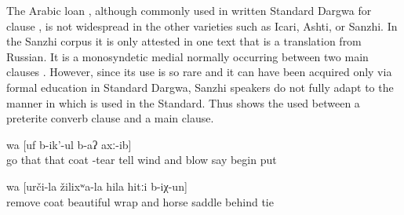 The Arabic loan , although commonly used in written Standard Dargwa for clause  \citep{vandenBerg2004}, is not widespread in the other varieties such as Icari, Ashti, or Sanzhi. In the Sanzhi corpus it is only attested in one text that is a translation from Russian. It is a monosyndetic medial  normally occurring between two main clauses . However, since its use is so rare and it can have been acquired only via formal education in Standard Dargwa, Sanzhi speakers do not fully adapt to the manner in which  is used in the Standard. Thus  shows the  used between a preterite converb clause and a main clause.
%
\begin{exe}
	\ex	\label{ex:‎I will blow at him, I will take his coat off, said the wind and began to blow}
	\gll	[``du	či-b-uq-un-ne	hel-i-j,	hel-i-la	walžaʁ	či-r-sa-jsː-an=da,''	b-urs-ib	č'an-ni]	wa	[uf	b-ik'-ul	b-aʔ	axː-ib]\\
			go	that	that	coat	-tear	tell	wind	and	blow	\tsc{n-}say	begin	put\\
	\glt	{}

	\ex	\label{ex:‎‎‎He took off his coat, put it together well, and tied it to his horse's saddle.}
		wa	[urči-la	žilixʷa-la	hila	hitːi	b-iχ-un]\\
		remove		coat	beautiful	wrap	and	horse\tsc{-gen}	saddle	behind		tie\\
	\glt	{}
\end{exe}

